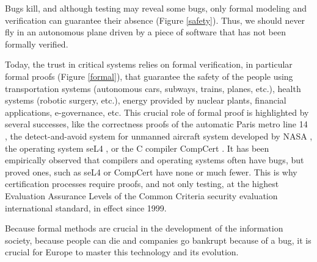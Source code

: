 \thispagestyle{empty}

Bugs kill, and although testing may reveal some bugs, only formal
modeling and verification can guarantee their absence (Figure
\ref{safety}).  Thus, we should never fly in an autonomous plane driven by a
piece of software that has not been formally verified.

Today, the trust in critical systems relies on formal verification, in
particular formal proofs (Figure \ref{formal}), that guarantee the
safety of the people using transportation systems (autonomous cars,
subways, trains, planes, etc.), health systems (robotic surgery,
etc.), energy provided by nuclear plants, financial applications,
e-governance, etc. This crucial role of formal proof is highlighted by
several successes, like the correctness proofs of the automatic Paris
metro line 14 \cite{metro14}, the detect-and-avoid system for unmanned
aircraft system developed by NASA \cite{Munoz16}, the operating system
seL4 \cite{Klein09}, or the C compiler CompCert \cite{Leroy06}.  It
has been empirically observed that compilers and operating systems
often have bugs, but proved ones, such as seL4 or CompCert have none
or much fewer.  This is why certification processes require proofs,
and not only testing, at the highest Evaluation Assurance Levels of the 
Common Criteria security evaluation international standard, 
in effect since 1999. 

Because formal methods are crucial in the development of the
information society, because people can die and companies go bankrupt
because of a bug, it is crucial for Europe to master this technology
and its evolution.

